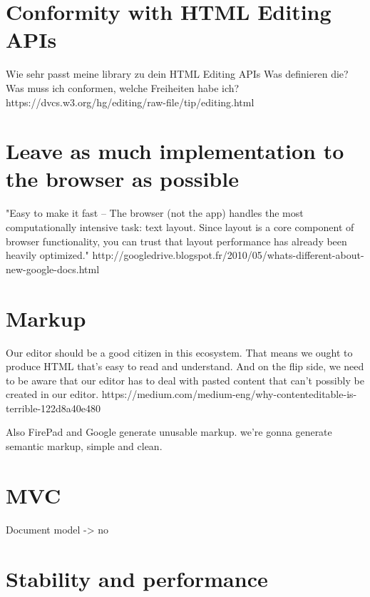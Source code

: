 \section{Conformity with HTML Editing APIs}
Wie sehr passt meine library zu dein HTML Editing APIs
Was definieren die?
Was muss ich conformen, welche Freiheiten habe ich?
https://dvcs.w3.org/hg/editing/raw-file/tip/editing.html

\section{Leave as much implementation to the browser as possible} 

"Easy to make it fast -- The browser (not the app) handles the most computationally intensive task: text layout. Since layout is a core component of browser functionality, you can trust that layout performance has already been heavily optimized." http://googledrive.blogspot.fr/2010/05/whats-different-about-new-google-docs.html

\section{Markup} 

Our editor should be a good citizen in this ecosystem. That means we ought to produce HTML that’s easy to read and understand. And on the flip side, we need to be aware that our editor has to deal with pasted content that can’t possibly be created in our editor. https://medium.com/medium-eng/why-contenteditable-is-terrible-122d8a40e480

Also FirePad and Google generate unusable markup. we're gonna generate semantic markup, simple and clean.



\section{MVC}

Document model -> no


\section{Stability and performance}

